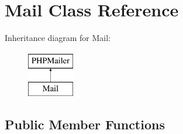\hypertarget{classMail}{}\section{Mail Class Reference}
\label{classMail}
Inheritance diagram for Mail\+:\begin{figure}[H]
\begin{center}
\leavevmode
\includegraphics[height=2.000000cm]{classMail}
\end{center}
\end{figure}
\subsection*{Public Member Functions}
